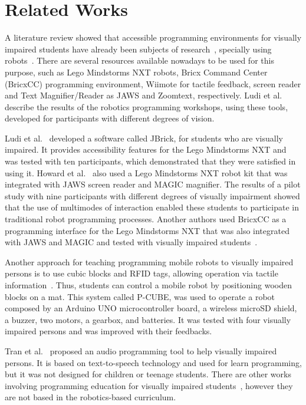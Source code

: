 \section{Related Works}
\label{sec:related}

A literature review showed that accessible programming environments for visually impaired students have already been subjects of research~\cite{Kakehashi2013, Kakehashi2014}, specially using robots~\cite{ludi2011,howard2012,ludi2014,  dorsey2013}. There are several resources available nowadays to be used for this purpose, such as Lego Mindstorms NXT robots, Bricx Command Center (BricxCC) programming environment, Wiimote for tactile feedback, screen reader and Text Magnifier/Reader as JAWS and Zoomtext, respectively. Ludi et al.~\cite{ludi2011} describe the results of the robotics programming workshops, using these tools, developed for participants with different degrees of vision. 

Ludi et al.~\cite{ludi2014} developed a software called JBrick, for students who are visually impaired. It provides accessibility features for the Lego Mindstorms NXT and was tested with ten participants, which demonstrated that they were satisfied in using it. Howard et al.~\cite{howard2012} also used a Lego Mindstorms NXT robot kit that was integrated with JAWS screen reader and MAGIC magnifier. The results of a pilot study with nine participants with different degrees of visually impairment showed that the use of multimodes of interaction enabled these students to participate in traditional robot programming processes. Another authors used BricxCC as a programming interface for the Lego Mindstorms NXT that was also integrated with JAWS and MAGIC and tested with visually impaired students~\cite{dorsey2013}.

Another approach for teaching programming mobile robots to visually impaired persons is to use cubic blocks and RFID tags, allowing operation via tactile information~\cite{Kakehashi2013,Kakehashi2014}. Thus, students can control a mobile robot by positioning wooden blocks on a mat. This system called P-CUBE, was used to operate a robot composed by an Arduino UNO microcontroller board, a wireless microSD shield, a buzzer, two motors, a gearbox, and batteries. It was tested with four visually impaired persons and was improved with their feedbacks.

Tran et al.~\cite{Tran2007} proposed an audio programming tool to help visually impaired persons. It is based on text-to-speech technology and used for learn programming, but it was not designed for children or teenage students. There are other works involving programming education for visually impaired students~\cite{Franqueiro2006, kane2014, Konecki2015}, however they are not based in the robotics-based curriculum.

